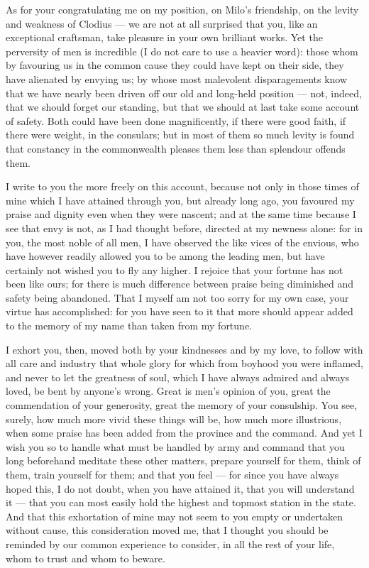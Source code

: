  As for your congratulating me on my position, on Milo's friendship, on the levity and weakness of Clodius --- we are not at all surprised that you, like an exceptional craftsman, take pleasure in your own brilliant works. Yet the perversity of men is incredible (I do not care to use a heavier word): those whom by favouring us in the common cause they could have kept on their side, they have alienated by envying us; by whose most malevolent disparagements know that we have nearly been driven off our old and long-held position --- not, indeed, that we should forget our standing, but that we should at last take some account of safety. Both could have been done magnificently, if there were good faith, if there were weight, in the consulars; but in most of them so much levity is found that constancy in the commonwealth pleases them less than splendour offends them.

 I write to you the more freely on this account, because not only in those times of mine which I have attained through you, but already long ago, you favoured my praise and dignity even when they were nascent; and at the same time because I see that envy is not, as I had thought before, directed at my newness alone: for in you, the most noble of all men, I have observed the like vices of the envious, who have however readily allowed you to be among the leading men, but have certainly not wished you to fly any higher. I rejoice that your fortune has not been like ours; for there is much difference between praise being diminished and safety being abandoned. That I myself am not too sorry for my own case, your virtue has accomplished: for you have seen to it that more should appear added to the memory of my name than taken from my fortune.

 I exhort you, then, moved both by your kindnesses and by my love, to follow with all care and industry that whole glory for which from boyhood you were inflamed, and never to let the greatness of soul, which I have always admired and always loved, be bent by anyone's wrong. Great is men's opinion of you, great the commendation of your generosity, great the memory of your consulship. You see, surely, how much more vivid these things will be, how much more illustrious, when some praise has been added from the province and the command. And yet I wish you so to handle what must be handled by army and command that you long beforehand meditate these other matters, prepare yourself for them, think of them, train yourself for them; and that you feel --- for since you have always hoped this, I do not doubt, when you have attained it, that you will understand it --- that you can most easily hold the highest and topmost station in the state. And that this exhortation of mine may not seem to you empty or undertaken without cause, this consideration moved me, that I thought you should be reminded by our common experience to consider, in all the rest of your life, whom to trust and whom to beware.

